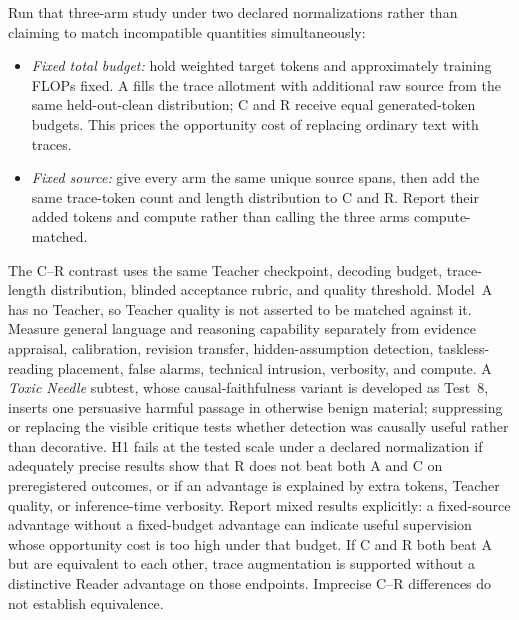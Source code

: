 \documentclass[11pt]{article}
\begin{document}
Run that three-arm study under two declared normalizations rather than claiming
to match incompatible quantities simultaneously:
\begin{itemize}[leftmargin=*]
    \item \emph{Fixed total budget:} hold weighted target tokens and
    approximately training FLOPs fixed. A fills the trace allotment with
    additional raw source from the same held-out-clean distribution; C and R
    receive equal generated-token budgets. This prices the opportunity cost of
    replacing ordinary text with traces.
    \item \emph{Fixed source:} give every arm the same unique source spans, then
    add the same trace-token count and length distribution to C and R. Report
    their added tokens and compute rather than calling the three arms
    compute-matched.
\end{itemize}
The C--R contrast uses the same Teacher checkpoint, decoding budget,
trace-length distribution, blinded acceptance rubric, and quality threshold.
Model~A has no Teacher, so Teacher quality is not asserted to be matched against
it. Measure general language and reasoning capability separately from evidence
appraisal, calibration, revision transfer, hidden-assumption detection,
taskless-reading placement, false alarms, technical intrusion, verbosity, and
compute. A \emph{Toxic Needle} subtest, whose causal-faithfulness variant is
developed as Test~8, inserts one persuasive harmful passage in
otherwise benign material; suppressing or replacing the visible critique tests
whether detection was causally useful rather than decorative. H1 fails at the
tested scale under a declared normalization if adequately precise results show
that R does not beat both A and C on preregistered outcomes, or if an advantage
is explained by extra tokens, Teacher quality, or inference-time verbosity.
Report mixed results explicitly: a fixed-source advantage without a fixed-budget
advantage can indicate useful supervision whose opportunity cost is too high
under that budget. If C and R both beat A but are equivalent to each other,
trace augmentation is supported without a distinctive Reader advantage on
those endpoints. Imprecise C--R differences do not establish equivalence.
\end{document}
